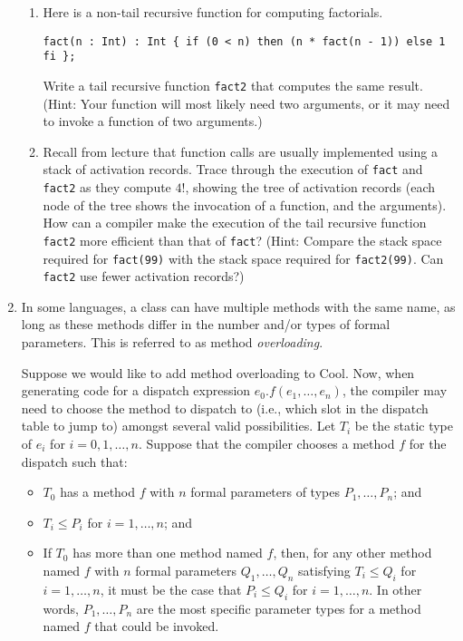 \documentclass[11pt]{article}
\begin{document}
\begin{enumerate}
\begin{enumerate}
\item Here is a non-tail recursive function for computing factorials.
\begin{verbatim}
fact(n : Int) : Int { if (0 < n) then (n * fact(n - 1)) else 1 fi };
\end{verbatim}
Write a tail recursive function \texttt{fact2} that computes the same
result.  (Hint: Your function will most likely need two arguments, or
it may need to invoke a function of two arguments.)

\item Recall from lecture that function calls are usually implemented
using a stack of activation records.  Trace through the execution of
\texttt{fact} and \texttt{fact2} as they compute $4!$, showing the
tree of activation records (each node of the tree shows the invocation
of a function, and the arguments).  How can a compiler make the
execution of the tail recursive function \texttt{fact2} more efficient
than that of \texttt{fact}?  (Hint: Compare the stack space required
for \texttt{fact(99)} with the stack space required for
\texttt{fact2(99)}.  Can \texttt{fact2} use fewer activation records?)
\end{enumerate}

\item In some languages, a class can have multiple methods with the
same name, as long as these methods differ in the number and/or types
of formal parameters.  This is referred to as method
{\em overloading}.

Suppose we would like to add method overloading to Cool.  Now, when
generating code for a dispatch expression
$e_{0}.f(e_{1}, \dots, e_{n})$, the compiler may need to choose the
method to dispatch to (i.e., which slot in the dispatch table to jump
to) amongst several valid possibilities.  Let $T_{i}$ be the static
type of $e_{i}$ for $i = 0, 1, \dots, n$.  Suppose that the compiler
chooses a method $f$ for the dispatch such that:
\begin{itemize}
\item $T_{0}$ has a method $f$ with $n$ formal parameters of types
$P_{1}, \dots, P_{n}$; and

\item $T_{i} \leq P_{i}$ for $i = 1, \dots, n$; and

\item If $T_{0}$ has more than one method named $f$, then, for any
other method named $f$ with $n$ formal parameters
$Q_{1}, \dots, Q_{n}$ satisfying $T_{i} \leq Q_{i}$ for
$i = 1, \dots, n$, it must be the case that $P_{i} \leq Q_{i}$ for
$i = 1, \dots, n$.  In other words, $P_{1}, \dots, P_{n}$ are the most
specific parameter types for a method named $f$ that could be invoked.
\end{itemize}


\end{enumerate}
\end{document}

